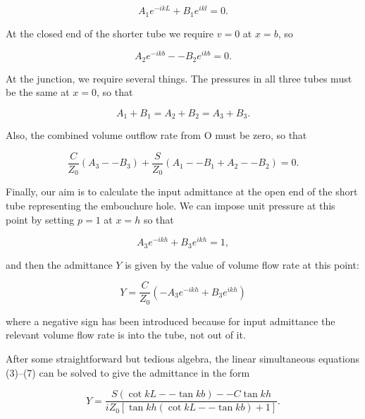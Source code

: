   \begin{equation*}A_1 e^{-ikL} + B_1 e^{ikl} =0. \tag{3}\end{equation*} 

  At the closed end of the shorter tube we require $v=0$ at $x=b$, so 

  \begin{equation*}A_2 e^{-ikb} -- B_2 e^{ikb} =0. \tag{4}\end{equation*} 

  At the junction, we require several things. The pressures in all three tubes 
  must be the same at $x=0$, so that 

  \begin{equation*}A_1+B_1 = A_2 + B_2 = A_3 + B_3 . \tag{5}\end{equation*} 

  Also, the combined volume outflow rate from O must be zero, so that 

  \begin{equation*}\dfrac{C}{Z_0}(A_3 -- B_3) + \dfrac{S}{Z_0}(A_1 -- B_1 + A_2 
  -- B_2) = 0 . \tag{6}\end{equation*} 

  Finally, our aim is to calculate the input admittance at the open end of the 
  short tube representing the embouchure hole. We can impose unit pressure at 
  this point by setting $p=1$ at $x=h$ so that 

  \begin{equation*}A_3 e^{-ikh} + B_3 e^{ikh} =1, \tag{7}\end{equation*} 

  \noindent{}and then the admittance $Y$ is given by the value of volume flow 
  rate at this point: 

  \begin{equation*}Y=\dfrac{C}{Z_0}\left( -A_3 e^{-ikh} + B_3 e^{ikh} \right) 
  \tag{8}\end{equation*} 

  \noindent{}where a negative sign has been introduced because for input 
  admittance the relevant volume flow rate is into the tube, not out of it. 

  After some straightforward but tedious algebra, the linear simultaneous 
  equations (3)--(7) can be solved to give the admittance in the form 

  \begin{equation*}Y = \dfrac{S (\cot kL -- \tan kb ) -- C \tan kh}{i Z_0 
  \left[ \tan kh (\cot kL -- \tan kb ) +1 \right]} . \tag{9}\end{equation*} 

